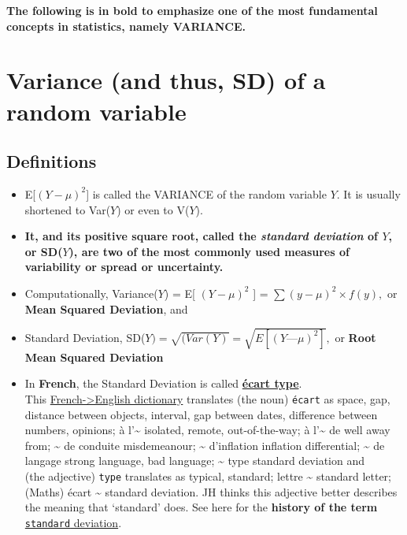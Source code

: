 \documentclass[]{book}
\begin{document}
\textbf{The following is in bold to emphasize one of the most fundamental concepts in statistics, namely VARIANCE.}

\hypertarget{variance-and-thus-sd-of-a-random-variable}{%
\section{Variance (and thus, SD) of a random variable}\label{variance-and-thus-sd-of-a-random-variable}}

\hypertarget{definitions}{%
\subsection{Definitions}\label{definitions}}

\begin{itemize}
\item
  E{[}\((Y - \mu)^2\){]} is called the VARIANCE of the random variable \(Y\). It is usually shortened to Var(\(Y\)) or even to V(\(Y\)).
\item
  \textbf{It, and its positive square root, called the \emph{standard deviation} of \(Y\), or SD(\(Y\)), are two of the most commonly used measures of variability or spread or uncertainty.}
\item
  Computationally, Variance(\(Y\)) = E{[} \((Y - \mu)^2\) {]} = \(\sum(y - \mu)^2 \times f(y),\) or \textbf{Mean Squared Deviation}, and
\item
  Standard Deviation, SD(\(Y) = \sqrt{(Var(Y)}= \sqrt{E[ (Y — \mu)^2]},\) or \textbf{Root Mean Squared Deviation}
\item
  In \textbf{French}, the Standard Deviation is called \href{https://fr.wikipedia.org/wiki/Écart_type}{\textbf{écart type}}.\\
  This \href{http://www.french-linguistics.co.uk/dictionary/type.html}{French-\textgreater{}English dictionary} translates (the noun) \texttt{écart} as space, gap, distance between objects, interval, gap between dates, difference between numbers, opinions; à l'\textasciitilde{} isolated, remote, out-of-the-way; à l'\textasciitilde{} de well away from; \textasciitilde{} de conduite misdemeanour; \textasciitilde{} d'inflation inflation differential; \textasciitilde{} de langage strong language, bad language; \textasciitilde{} type standard deviation and\\
  (the adjective) \texttt{type} translates as typical, standard; lettre \textasciitilde{} standard letter; (Maths) écart \textasciitilde{} standard deviation. JH thinks this adjective better describes the meaning that `standard' does. See here for the \textbf{history of the term} \href{https://en.wikipedia.org/wiki/Standard_deviation\#History}{\texttt{standard} deviation}.
\end{itemize}
\end{document}
